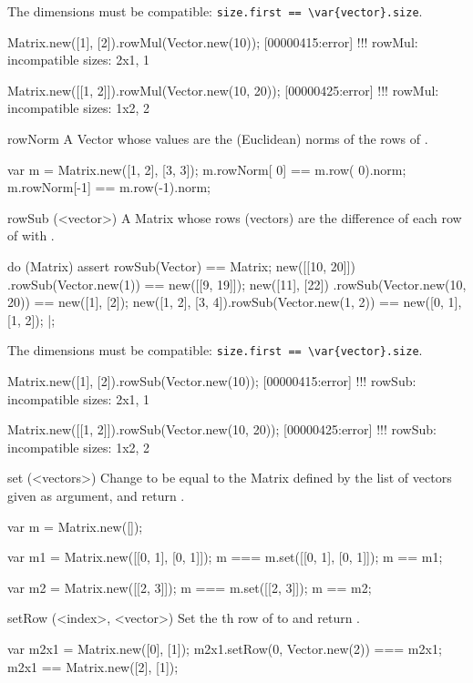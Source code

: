 \begin{urbiscriptapi}
  The dimensions must be compatible:
  \lstinline|size.first == \var{vector}.size|.
\begin{urbiscript}
Matrix.new([1], [2]).rowMul(Vector.new(10));
[00000415:error] !!! rowMul: incompatible sizes: 2x1, 1

Matrix.new([[1, 2]]).rowMul(Vector.new(10, 20));
[00000425:error] !!! rowMul: incompatible sizes: 1x2, 2
\end{urbiscript}


\item[rowNorm]%
  A Vector whose values are the (Euclidean) norms of the rows of \this.
\begin{urbiassert}
var m = Matrix.new([1, 2], [3, 3]);
m.rowNorm[ 0] == m.row( 0).norm;
m.rowNorm[-1] == m.row(-1).norm;
\end{urbiassert}


\item[rowSub](<vector>)%
  A Matrix whose rows (vectors) are the difference of each row of \this with
  .
\begin{urbiscript}
do (Matrix)
{
  assert
  {
    rowSub(Vector) == Matrix;
    new([[10, 20]])    .rowSub(Vector.new(1))      == new([[9, 19]]);
    new([11], [22])    .rowSub(Vector.new(10, 20)) == new([1], [2]);
    new([1, 2], [3, 4]).rowSub(Vector.new(1, 2))   == new([0, 1], [1, 2]);
  }
}|;
\end{urbiscript}

  The dimensions must be compatible:
  \lstinline|size.first == \var{vector}.size|.
\begin{urbiscript}
Matrix.new([1], [2]).rowSub(Vector.new(10));
[00000415:error] !!! rowSub: incompatible sizes: 2x1, 1

Matrix.new([[1, 2]]).rowSub(Vector.new(10, 20));
[00000425:error] !!! rowSub: incompatible sizes: 1x2, 2
\end{urbiscript}


\item[set](<vectors>)%
  Change \this to be equal to the Matrix defined by the list of vectors
  given as argument, and return \this.
\begin{urbiassert}
var m = Matrix.new([]);

var m1 = Matrix.new([[0, 1], [0, 1]]);
    m  ===    m.set([[0, 1], [0, 1]]);
    m  == m1;

var m2 = Matrix.new([[2, 3]]);
    m  ===    m.set([[2, 3]]);
    m  == m2;
\end{urbiassert}


\item[setRow](<index>, <vector>)%
  Set the th row of \this to  and return \this.
\begin{urbiassert}
var m2x1 = Matrix.new([0], [1]);
m2x1.setRow(0, Vector.new(2)) === m2x1;
m2x1 == Matrix.new([2], [1]);


\end{urbiassert}
\end{urbiscriptapi}
